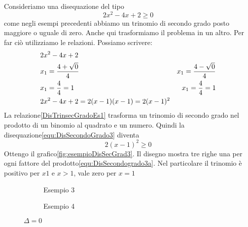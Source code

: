Consideriamo una disequazione del tipo
\begin{equation}
2x^2-4x+2\geq 0\label{equ:DisSecondoGrado3}
\end{equation} 
come negli esempi precedenti abbiamo un trinomio di secondo grado  posto maggiore o uguale di zero. Anche qui trasformiamo  il problema in un altro. Per far ciò  utilizziamo le relazioni\nobs{}.
Possiamo scrivere:
\begin{align}
&2x^2-4x+2\\
&x_{1}=\dfrac{4+\sqrt{0}}{4}\notag
&x_{1}=\dfrac{4-\sqrt{0}}{4}\notag\\
&x_{1}=\dfrac{4}{4}=1\notag
&x_{1}=\dfrac{4}{4}=1\notag\\
&2x^2-4x+2=2(x-1)(x-1)=2(x-1)^2\label{DisTrinsecGradoEs3}
\end{align}
La relazione\nobs\vref{DisTrinsecGradoEs1} trasforma un trinomio di secondo grado nel prodotto di un binomio al quadrato e un numero. Quindi la disequazione\nobs\vref{equ:DisSecondoGrado3} diventa 
\begin{equation}
2(x-1)^2\geq 0\label{equ:DisSecondogrado3a}
\end{equation} 
Ottengo il grafico\nobs\vref{fig:esempioDisSecGrad3}. Il disegno mostra tre righe una per ogni fattore del prodotto\nobs\vref{equ:DisSecondogrado3a}. Nel particolare il trinomio è positivo per $x1$ e $x>1$, vale zero  per $x=1$
\begin{figure}
	\centering
	\begin{subfigure}[b]{.4\linewidth}
		\centering
		
		\caption{Esempio 3}
		\label{fig:esempioDisSecGrad3}
	\end{subfigure}%
	\centering
	\begin{subfigure}[b]{.4\linewidth}
		\centering
		
		\caption{Esempio 4}
		\label{fig:esempioDisSecGrad4}
	\end{subfigure}%
	\caption{$\Delta=0$}
	\label{fig:DeltaUguZeroEsempio2}
\end{figure}

